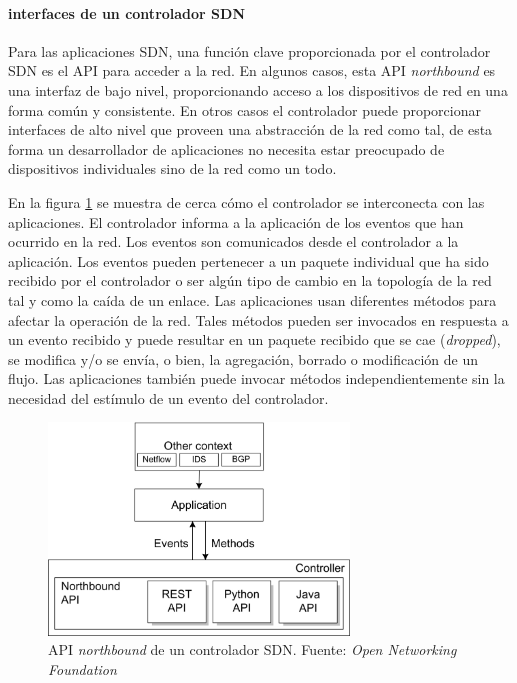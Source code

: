 \documentclass[10pt,journal,compsoc]{IEEEtran}
\begin{document}
\paragraph{interfaces de un controlador SDN}
Para las aplicaciones SDN, una función clave proporcionada por el controlador SDN es el API para acceder a la red. En algunos casos, esta API \emph{northbound} es una interfaz de bajo nivel, proporcionando acceso a los dispositivos de red en una forma común y consistente. En otros casos el controlador puede proporcionar interfaces de alto nivel que proveen una abstracción de la red como tal, de esta forma un desarrollador de aplicaciones no necesita estar preocupado de dispositivos individuales sino de la red como un todo.

En la figura \ref{fig:sdn-controlador-2} se muestra de cerca cómo el controlador se interconecta con las aplicaciones. El controlador informa a la aplicación de los eventos que han ocurrido en la red. Los eventos son comunicados desde el controlador a la aplicación. Los eventos pueden pertenecer a un paquete individual que ha sido recibido por el controlador o ser algún tipo de cambio en la topología de la red tal y como la caída de un enlace. Las aplicaciones usan diferentes métodos para afectar la operación de la red. Tales métodos pueden ser invocados en respuesta a un evento recibido y puede resultar en un paquete recibido que se cae (\emph{dropped}), se modifica y/o se envía, o bien, la agregación, borrado o modificación de un flujo. Las aplicaciones también puede invocar métodos independientemente sin la necesidad del estímulo de un evento del controlador.

\begin{figure}[h]
    \centering
    \includegraphics[width=8cm]{controller-2}
    \caption{API \emph{northbound} de un controlador SDN. Fuente: \emph{Open Networking Foundation}}
    \label{fig:sdn-controlador-2}
\end{figure}
\end{document}
